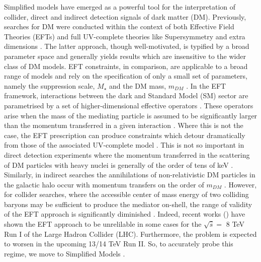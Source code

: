 \begin{flushleft}
Simplified models have emerged as a powerful tool for the interpretation of collider, direct and indirect detection signals of dark matter (DM). Previously,  searches for DM were conducted within the context of both Effective Field Theories (EFTs) \cite{Aad:1363019, ATLAS-CONF-2012-147, CMS-PAS-EXO-12-048, Buckley:2013jwa, Abdallah:1472683, MonoZ, MonoX} and full UV-complete theories like Supersymmetry \cite{ComppMSSM, Aad:2012ms, Aad:2012fqa, Aad:2014wea, SUSY_official_paper} and extra dimensions \cite{}. The latter approach, though well-motivated, is typified by a broad parameter space and generally yields results which are insensitive to the wider class of DM models. EFT constraints, in comparison, are applicable to a broad range of models and rely on the specification of only a small set of parameters, namely the suppression scale, $M_{\star}$ and the DM mass, $m_{DM}$ \cite{}. 
In the EFT framework, interactions between the dark and Standard Model (SM) sector are parametrised by a set of higher-dimensional effective operators \cite{}. These operators arise when the mass of the mediating particle is assumed to be significantly larger than the momentum transferred in a given interaction \cite{}. Where this is not the case, the EFT prescription can produce constraints which detour dramatically from those of the associated UV-complete model \cite{Bai:2010hh, DMCons2, Fox:2011fx, Graesser:2011vj, An:2011ck}. This is not so important in direct detection experiments where the momentum transferred in the scattering of DM particles with heavy nuclei is generally of the order of tens of keV \cite{EFTDM, DMCons3}. Similarly, in indirect searches the annihilations of non-relativistic DM particles in the galactic halo occur with momentum transfers on the order of $m_{DM}$ \cite{}. However, for collider searches, where the accessible center of mass energy of two colliding baryons may be sufficient to produce the mediator on-shell, the range of validity of the EFT approach is significantly diminished \cite{}. Indeed, recent works (\cite{}) have shown the EFT approach to be unrelilable in some cases for the $\sqrt{\hat{s}} =$ 8 TeV Run I of the Large Hadron Collider (LHC). Furthermore, the problem is expected to worsen in the upcoming 13/14 TeV Run II. So, to accurately probe this regime, we move to Simplified Models \cite{Buchmueller:2014yoa}.
\bigskip


\end{flushleft}
